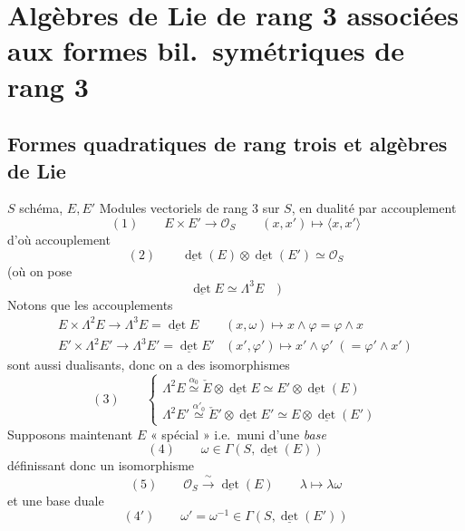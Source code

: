 \documentclass[11pt,a4paper]{article}
\begin{document}
\section*{Algèbres de Lie de rang 3 associées aux formes bil.\ symétriques de rang 3}

\subsection*{Formes quadratiques de rang trois et algèbres de Lie}

$S$ schéma, $E, E'$ Modules vectoriels de rang 3 sur $S$, en dualité par
accouplement
\[
  (1) \qquad E \times E' \longrightarrow \mathcal{O}_S \qquad (x, x') \longmapsto \langle x, x' \rangle
\]
d'où accouplement
\[
  (2) \qquad \underline{\det}(E) \otimes \underline{\det}(E') \simeq \mathcal{O}_S
\]
(où on pose
\[
  \underline{\det} E \simeq \Lambda^3 E \quad )
\]
Notons que les accouplements
\[
  \begin{array}{ll}
    E \times \Lambda^2 E \longrightarrow \Lambda^3 E = \underline{\det} E & (x, \omega) \longmapsto x \wedge \varphi = \varphi \wedge x \\
    E' \times \Lambda^2 E' \longrightarrow \Lambda^3 E' = \underline{\det} E' & (x', \varphi') \longmapsto x' \wedge \varphi' \; (= \varphi' \wedge x')
  \end{array}
\]
sont aussi dualisants, donc on a des isomorphismes
\[
  (3) \qquad
  \begin{cases}
    \Lambda^2 E \overset{\alpha_0}{\simeq} \check{E} \otimes \underline{\det} E \simeq E' \otimes \underline{\det}(E) \\
    \Lambda^2 E' \overset{\alpha'_0}{\simeq} \check{E}' \otimes \underline{\det} E' \simeq E \otimes \underline{\det}(E')
  \end{cases}
\]
Supposons maintenant $E$ « spécial » i.e.\ muni d'une \emph{base}
\[
  (4) \qquad \omega \in \Gamma(S, \underline{\det}(E))
\]
définissant donc un isomorphisme
\[
  (5) \qquad \mathcal{O}_S \xrightarrow{\ \sim\ } \underline{\det}(E) \qquad \lambda \longmapsto \lambda\omega
\]
et une base duale
\[
  (4') \qquad \omega' = \omega^{-1} \in \Gamma(S, \underline{\det}(E'))
\]
\end{document}
